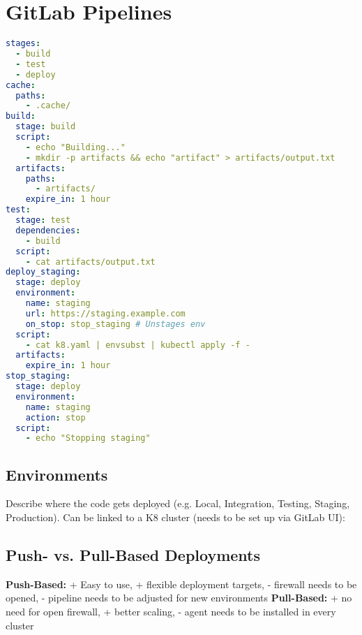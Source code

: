 \section{GitLab Pipelines}
\begin{lstlisting}[language=yaml]
stages:
  - build
  - test
  - deploy
cache:
  paths:
    - .cache/
build:
  stage: build
  script:
    - echo "Building..."
    - mkdir -p artifacts && echo "artifact" > artifacts/output.txt
  artifacts:
    paths:
      - artifacts/
    expire_in: 1 hour
test:
  stage: test
  dependencies:
    - build
  script:
    - cat artifacts/output.txt
deploy_staging:
  stage: deploy
  environment:
    name: staging
    url: https://staging.example.com
    on_stop: stop_staging # Unstages env
  script:
    - cat k8.yaml | envsubst | kubectl apply -f -
  artifacts:
    expire_in: 1 hour
stop_staging:
  stage: deploy
  environment:
    name: staging
    action: stop
  script:
    - echo "Stopping staging"
\end{lstlisting}
\subsection{Environments}
Describe where the code gets deployed (e.g. Local, Integration, Testing, Staging, Production). Can be linked to a K8 cluster (needs to be set up via GitLab UI):
\subsection{Push- vs. Pull-Based Deployments}
\textbf{Push-Based:} + Easy to use, + flexible deployment targets, - firewall needs to be opened, - pipeline needs to be adjusted for new environments \textbf{Pull-Based:} + no need for open firewall, + better scaling, - agent needs to be installed in every cluster
